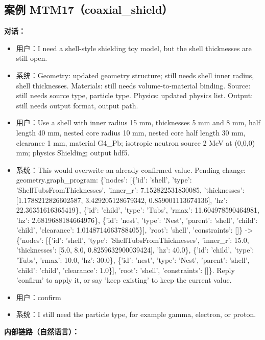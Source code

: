 \documentclass[11pt]{ctexart}
\begin{document}
\subsection{案例 MTM17（coaxial\_shield）}
\textbf{对话：}
\begin{itemize}
\item 用户：I need a shell-style shielding toy model, but the shell thicknesses are still open.
\item 系统：Geometry: updated geometry structure; still needs shell inner radius, shell thicknesses. Materials: still needs volume-to-material binding. Source: still needs source type, particle type. Physics: updated physics list. Output: still needs output format, output path.
\item 用户：Use a shell with inner radius 15 mm, thicknesses 5 mm and 8 mm, half length 40 mm, nested core radius 10 mm, nested core half length 30 mm, clearance 1 mm, material G4\_Pb; isotropic neutron source 2 MeV at (0,0,0) mm; physics Shielding; output hdf5.
\item 系统：This would overwrite an already confirmed value. Pending change: geometry.graph\_program: \{'nodes': [\{'id': 'shell', 'type': 'ShellTubsFromThicknesses', 'inner\_r': 7.152822531830085, 'thicknesses': [1.1788212826602587, 3.429205128679342, 0.859001113674136], 'hz': 22.36351616365419\}, \{'id': 'child', 'type': 'Tubs', 'rmax': 11.604978590464981, 'hz': 2.6819688184664976\}, \{'id': 'nest', 'type': 'Nest', 'parent': 'shell', 'child': 'child', 'clearance': 1.0148714663788405\}], 'root': 'shell', 'constraints': []\} -> \{'nodes': [\{'id': 'shell', 'type': 'ShellTubsFromThicknesses', 'inner\_r': 15.0, 'thicknesses': [5.0, 8.0, 0.8259632900039424], 'hz': 40.0\}, \{'id': 'child', 'type': 'Tubs', 'rmax': 10.0, 'hz': 30.0\}, \{'id': 'nest', 'type': 'Nest', 'parent': 'shell', 'child': 'child', 'clearance': 1.0\}], 'root': 'shell', 'constraints': []\}. Reply 'confirm' to apply it, or say 'keep existing' to keep the current value.
\item 用户：confirm
\item 系统：I still need the particle type, for example gamma, electron, or proton.
\end{itemize}
\textbf{内部链路（自然语言）：}
\end{document}
